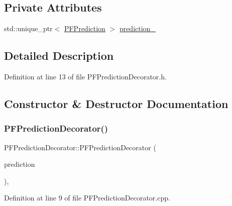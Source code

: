 \subsection*{Private Attributes}
\begin{DoxyCompactItemize}
\item 
std\+::unique\+\_\+ptr$<$ \mbox{\hyperlink{classbfl_1_1PFPrediction}{P\+F\+Prediction}} $>$ \mbox{\hyperlink{classbfl_1_1PFPredictionDecorator_a95f122f6fb7e69c436ae221c40d1c515}{prediction\+\_\+}}
\end{DoxyCompactItemize}


\subsection{Detailed Description}


Definition at line 13 of file P\+F\+Prediction\+Decorator.\+h.



\subsection{Constructor \& Destructor Documentation}
\mbox{\label{classbfl_1_1PFPredictionDecorator_ab2b0e6cdba28a84750be81633a1a0d17}} 
\subsubsection{\texorpdfstring{P\+F\+Prediction\+Decorator()}{PFPredictionDecorator()}\hspace{0.1cm}{\footnotesize\ttfamily [1/2]}}
{\footnotesize\ttfamily P\+F\+Prediction\+Decorator\+::\+P\+F\+Prediction\+Decorator (\begin{DoxyParamCaption}\item[{std\+::unique\+\_\+ptr$<$ \mbox{\hyperlink{classbfl_1_1PFPrediction}{P\+F\+Prediction}} $>$}]{prediction }\end{DoxyParamCaption})\hspace{0.3cm}{\ttfamily [protected]}, {\ttfamily [noexcept]}}



Definition at line 9 of file P\+F\+Prediction\+Decorator.\+cpp.

